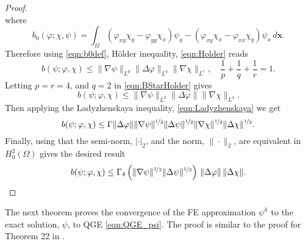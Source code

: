 \begin{proof}
\begin{equation*}
  \end{equation*}
  where
  \begin{equation}
    b_0(\varphi;\chi,\psi) = \int_{\Omega}\!
      (\varphi_{xy} \chi_y - \varphi_{yy} \chi_x) \psi_y
      - (\varphi_{xy} \chi_x - \varphi_{xx} \chi_y) \psi_x \, d\mathbf{x}.
    \label{eqn:b0def}
  \end{equation}
  Therefore using \eqref{eqn:b0def}, H\"older inequality, \eqref{eqn:Holder} reads
  \begin{equation}
    b(\psi; \varphi, \chi) \le \|\nabla \psi\|_{L^p} \|\Delta \varphi\|_{L^q}
    \|\nabla \chi\|_{L^r},\quad \frac{1}{p} + \frac{1}{q} + \frac{1}{r} = 1.
    \label{eqn:BStarHolder}
  \end{equation}
  Letting $p = r = 4$, and $q = 2$ in \eqref{eqn:BStarHolder} gives
  \begin{equation*}
    b(\psi; \varphi, \chi) \le \|\nabla \psi\|_{L^4} \|\Delta \varphi\|
    \|\nabla \chi\|_{L^4}.
  \end{equation*}
  Then applying the Ladyzhenskaya inequality, \eqref{eqn:Ladyzhenskaya} we get
  \begin{equation*}
    b(\psi;\varphi,\chi) \le \Gamma \|\Delta \varphi\|
      \|\nabla \psi\|^{\nicefrac{1}{2}} \|\Delta \psi\|^{\nicefrac{1}{2}}
      \|\nabla \chi\|^{\nicefrac{1}{2}} \|\Delta \chi\|^{\nicefrac{1}{2}}.
  \end{equation*}
  Finally, using that the semi-norm, $|\cdot|_2$, and the norm, $\|\cdot\|_2$,
  are equivalent in $H^2_0(\Omega)$ gives the desired result
  \begin{equation*}
    b(\psi;\varphi,\chi) \le \Gamma_4 \left(\|\nabla \psi\|^{\nicefrac{1}{2}}
      \|\Delta \psi\|^{\nicefrac{1}{2}}\right)\,
      \|\Delta \varphi\|\, \|\Delta \chi\|.
  \end{equation*}
\end{proof}
The next theorem proves the convergence of the FE approximation $\psi^h$ to the
exact solution, $\psi$, to QGE \eqref{eqn:QGE_psi}. The proof is similar to
the proof for Theorem 22 in \cite{Layton08}. \\
